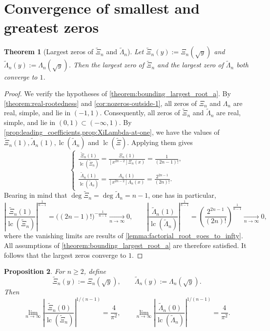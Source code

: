 \documentclass[11pt,twoside]{article}
\newtheorem{theorem}{Theorem}[section]
\newtheorem{proposition}[theorem]{Proposition}
\numberwithin{equation}{section}
\begin{document}
\section{Convergence of smallest and greatest zeros}
\begin{theorem}[Largest zeros of $\widetilde\Xi_n$ and $\widetilde\Lambda_n$]\label{theorem:extremal-zeros-Xi-Lambda}
Let $\widetilde\Xi_n(y):=\Xi_n(\sqrt{y})$ and
$\widetilde\Lambda_n(y):=\Lambda_n(\sqrt{y})$.
Then the largest zero of $\widetilde\Xi_n$ and the largest zero of $\widetilde\Lambda_n$
both converge to $1$.
\end{theorem}
\begin{proof}
We verify the hypotheses of
\cref{theorem:bounding_largest_root_a}.
By \cref{theorem:real-rootedness} and \cref{cor:nozeros-outside-1},
all zeros of $\Xi_n$ and $\Lambda_n$ are real, simple, and lie in $(-1,1)$.
Consequently, all zeros of $\widetilde\Xi_n$ and $\widetilde\Lambda_n$
are real, simple, and lie in $(0,1) \subset (-\infty,1)$. By \cref{prop:leading_coefficients,prop:XiLambda-at-one}, we have the values of $\widetilde\Xi_n(1), \widetilde\Lambda_n(1), \operatorname{lc}(\widetilde\Lambda_n)$ and $\operatorname{lc}(\widetilde\Xi)$. Applying them gives
\[
\begin{cases}
\displaystyle
\frac{\widetilde\Xi_n(1)}{\operatorname{lc}(\widetilde\Xi_n)}
=\frac{\Xi_n(1)}{[x^{2n-2}]\Xi_n(x)}
=\frac{1}{(2n-1)!},\\[1.25em]
\displaystyle
\frac{\widetilde\Lambda_n(1)}{\operatorname{lc}(\widetilde\Lambda_n)}
=\frac{\Lambda_n(1)}{[x^{2n-2}]\Lambda_n(x)}
=\frac{2^{2n-1}}{(2n)!}.
\end{cases}
\]
Bearing in mind that $\deg \widetilde\Xi_n=\deg \widetilde\Lambda_n=n-1$, one has in particular,
\[
\left|\frac{\widetilde\Xi_n(1)}{\operatorname{lc}(\widetilde\Xi_n)}\right|^{\frac{1}{n-1}}
=\bigl((2n-1)!\bigr)^{-\frac{1}{n-1}}\xrightarrow[n\to\infty]{}0,
\qquad
\left|\frac{\widetilde\Lambda_n(1)}{\operatorname{lc}(\widetilde\Lambda_n)}\right|^{\frac{1}{n-1}}
=\left(\frac{2^{2n-1}}{(2n)!}\right)^{\frac{1}{n-1}} \xrightarrow[n\to\infty]{}0,
\]
where the vanishing limits are results of \cref{lemma:factorial_root_goes_to_infty}. All assumptions of
\cref{theorem:bounding_largest_root_a}
are therefore satisfied.
It follows that the largest zeros converge to $1$.
\end{proof}

\begin{proposition}\label{prop:endpoint-ratio-limit}
For $n\ge2$, define
\[
\widetilde{\Xi}_n(y):=\Xi_n(\sqrt y),
\qquad
\widetilde{\Lambda}_n(y):=\Lambda_n(\sqrt y).
\]
Then
\[
\lim_{n\to\infty}
\left|
\frac{\widetilde{\Xi}_n(0)}{\operatorname{lc}(\widetilde{\Xi}_n)}
\right|^{1/(n-1)}
=
\frac{4}{\pi^2},
\qquad
\lim_{n\to\infty}
\left|
\frac{\widetilde{\Lambda}_n(0)}{\operatorname{lc}(\widetilde{\Lambda}_n)}
\right|^{1/(n-1)}
=
\frac{4}{\pi^2}.
\]
\end{proposition}
\end{document}

